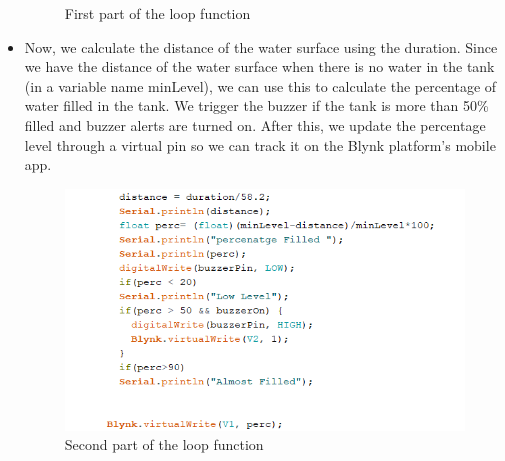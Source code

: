 \documentclass[12pt]{article}
\begin{document}
\begin{itemize}
\begin{figure}[H]
    \caption{First part of the loop function}
\end{figure}
\item Now, we calculate the distance of the water surface using the duration. Since we have the distance of the water surface when there is no water in the tank (in a variable name minLevel), we can use this to calculate the percentage of water filled in the tank. We trigger the buzzer if the tank is more than 50\% filled and buzzer alerts are turned on. After this, we update the percentage level through a virtual pin so we can track it on the Blynk platform's mobile app.
\begin{figure}[H]
\centering
    \includegraphics[scale=0.85]{loop2.png}
    \caption{Second part of the loop function}
\end{figure}
\end{itemize}
\end{document}
